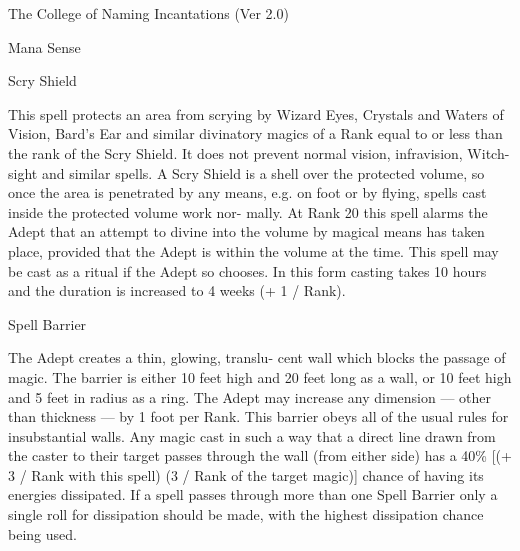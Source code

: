\begin{Chapter}{The College of Naming Incantations (Ver 2.0)}
\begin{spell}[S-7]{Mana Sense }
\begin{effects}
\end{effects}
\end{spell}

\begin{spell}[S-8]{Scry Shield }

\begin{effects}
This spell protects an area from scrying by 
Wizard  Eyes,  Crystals  and  Waters  of  Vision, 
Bard’s Ear and similar divinatory magics of a Rank 
equal to or less than the rank of the Scry Shield. It 
does not prevent normal vision, infravision, Witch-
sight  and  similar  spells.  A  Scry  Shield  is  a  shell 
over  the  protected  volume,  so  once  the  area  is 
penetrated by any means, e.g. on foot or by flying, 
spells  cast  inside  the  protected  volume  work  nor-
mally. At Rank 20 this spell alarms the Adept that 
an  attempt  to  divine  into  the  volume  by  magical 
means  has  taken  place,  provided  that  the  Adept  is 
within  the  volume  at  the  time.  This  spell  may  be 
cast as a ritual if the Adept so chooses. In this form 
casting takes 10 hours and the duration is increased 
to 4 weeks (+ 1 / Rank). 

\end{effects}
\end{spell}

\begin{spell}[S-9]{Spell Barrier }

\begin{effects}
The Adept creates a thin, glowing, translu-
cent  wall  which blocks  the  passage  of  magic.  The 
barrier  is  either  10  feet  high and 20 feet  long  as  a 
wall, or 10 feet high and 5 feet in radius as a ring. 
The  Adept  may  increase  any  dimension  —  other 
than thickness — by 1 foot per Rank. This barrier 
obeys all  of the usual rules for insubstantial walls. 
Any  magic  cast  in  such  a  way  that  a  direct  line 
drawn from the caster to their target passes through 
the wall (from either side) has a 40\% [(+ 3 / Rank 
with  this  spell)  (3  /  Rank  of  the  target  magic)] 
chance  of  having  its  energies  dissipated.  If  a  spell 
passes through more than one Spell  Barrier only a 
single roll for dissipation should be made, with the 
highest dissipation chance being used. 


\end{effects}
\end{spell}
\end{Chapter}
